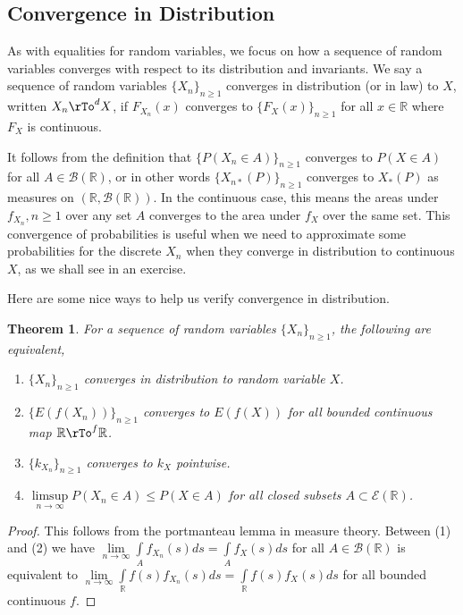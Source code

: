 \documentclass[12pt]{amsart}
\newtheorem{theorem}{Theorem}[section]
\theoremstyle{definition}
\begin{document}
\subsection{Convergence in Distribution}  As with equalities for random variables, we focus on how a sequence of random variables converges with respect to its distribution and invariants.
\dfn We say a sequence of random variables $\{X_n\}_{n \geq 1}$ converges in distribution (or in law) to $X$, written $X_n \rTo^{d} X$, if $F_{X_n}(x)$ converges to $\{F_X(x)\}_{n \geq 1}$ for all $x \in \mathbb{R}$ where $F_X$ is continuous.

It follows from the definition that $\{P(X_n \in A)\}_{n \geq 1}$ converges to $P(X \in A)$ for all $A \in \mathcal{B}(\mathbb{R})$, or in other words $\{X_{n*}(P)\}_{n \geq 1}$ converges to $X_*(P)$ as measures on $(\mathbb{R}, \mathcal{B}(\mathbb{R}))$. In the continuous case, this means the areas under $f_{X_n}, n \geq 1$ over any set $A$ converges to the area under $f_X$ over the same set. This convergence of probabilities is useful when we need to approximate some probabilities for the discrete $X_n$ when they converge in distribution to continuous $X$, as we shall see in an exercise.

Here are some nice ways to help us verify convergence in distribution.

\begin{theorem} \label{convergence_in_distribution_criteria} For a sequence of random variables $\{X_n\}_{n \geq 1}$, the following are equivalent,
\begin{enumerate}[1.]
\item $\{X_n\}_{n \geq 1}$ converges in distribution to random variable $X$.
\item $\{E(f(X_n))\}_{n \geq 1}$ converges to $E(f(X))$ for all bounded continuous map $\mathbb{R} \rTo^f \mathbb{R}$.
\item $\{k_{X_n}\}_{n \geq 1}$ converges to $k_X$ pointwise.
\item $\limsup\limits_{n \to \infty} P(X_n \in A) \leq P(X \in A)$ for all closed subsets $A \subset \mathcal{E}(\mathbb{R})$.
\end{enumerate}
\end{theorem}
\begin{proof} This follows from the portmanteau lemma in measure theory. Between (1) and (2) we have $\lim\limits_{n \to \infty} \int\limits_A f_{X_n}(s)ds = \int\limits_A f_X(s)ds$ for all $A \in \mathcal{B}(\mathbb{R})$ is equivalent to $\lim\limits_{n \to \infty} \int\limits_{\mathbb{R}} f(s)f_{X_n}(s)ds = \int\limits_{\mathbb{R}} f(s) f_X(s)ds$ for all bounded continuous $f$.
\end{proof}
\end{document}
